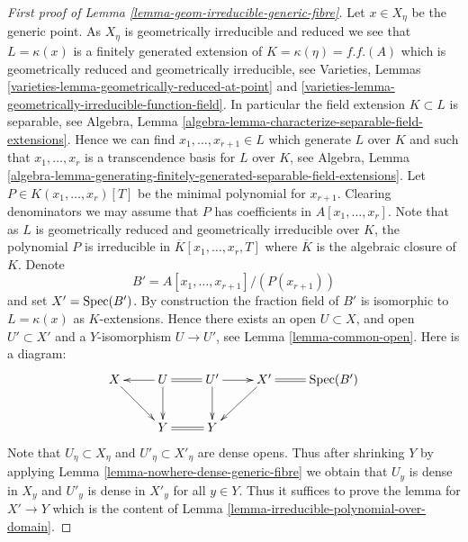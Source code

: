 \begin{proof}[First proof of Lemma \ref{lemma-geom-irreducible-generic-fibre}]
\medskip\noindent
Let $x \in X_\eta$ be the generic point. As $X_\eta$ is geometrically
irreducible and reduced we see that $L = \kappa(x)$ is a finitely generated
extension of $K = \kappa(\eta) = f.f.(A)$ which is geometrically reduced and
geometrically irreducible, see
Varieties, Lemmas \ref{varieties-lemma-geometrically-reduced-at-point} and
\ref{varieties-lemma-geometrically-irreducible-function-field}.
In particular the field extension $K \subset L$ is separable, see
Algebra, Lemma \ref{algebra-lemma-characterize-separable-field-extensions}.
Hence we can find $x_1, \ldots, x_{r + 1} \in L$ which generate $L$
over $K$ and such that $x_1, \ldots, x_r$ is a transcendence basis for
$L$ over $K$, see
Algebra, Lemma
\ref{algebra-lemma-generating-finitely-generated-separable-field-extensions}.
Let $P \in K(x_1, \ldots, x_r)[T]$ be the minimal polynomial for
$x_{r + 1}$. Clearing denominators we may assume that
$P$ has coefficients in $A[x_1, \ldots, x_r]$.
Note that as $L$ is geometrically reduced and geometrically irreducible
over $K$, the polynomial $P$ is irreducible in
$\overline{K}[x_1, \ldots, x_r, T]$ where $\overline{K}$ is the
algebraic closure of $K$. Denote
$$
B' = A[x_1, \ldots, x_{r + 1}]/(P(x_{r + 1}))
$$
and set $X' = \mathop{\rm Spec}(B')$. By construction the fraction field of $B'$
is isomorphic to $L = \kappa(x)$ as $K$-extensions. Hence there exists an
open $U \subset X$, and open $U' \subset X'$ and a $Y$-isomorphism
$U \to U'$, see
Lemma \ref{lemma-common-open}.
Here is a diagram:
$$
\xymatrix{
X \ar[rd] &
U \ar[l] \ar@{=}[r] \ar[d] &
U' \ar[r] \ar[d] &
X' \ar[ld] \ar@{=}[r] & \Spec(B') \\
& Y \ar@{=}[r] & Y &
}
$$
Note that $U_\eta \subset X_\eta$ and $U'_\eta \subset X'_\eta$ are
dense opens. Thus after shrinking $Y$ by applying
Lemma \ref{lemma-nowhere-dense-generic-fibre}
we obtain that $U_y$ is dense in $X_y$ and $U'_y$ is dense in $X'_y$
for all $y \in Y$. Thus it suffices to prove the lemma for
$X' \to Y$ which is the content of
Lemma \ref{lemma-irreducible-polynomial-over-domain}.
\end{proof}

